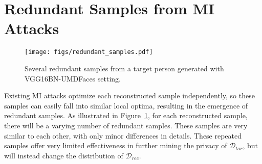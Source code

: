 
\section{Redundant Samples from MI Attacks}
\begin{figure}[t]%
	\centering
	\texttt{[image: figs/redundant\_samples.pdf]}
	\caption{Several redundant samples from a target person generated with VGG16BN-UMDFaces setting.}
	\label{fig:redundant_samples}
\end{figure}
Existing MI attacks optimize each reconstructed sample independently, so these samples can easily fall into similar local optima, resulting in the emergence of redundant samples.
As illustrated in Figure~\ref{fig:redundant_samples}, for each reconstructed sample, there will be a varying number of redundant samples.
These samples are very similar to each other, with only minor differences in details.
These repeated samples offer very limited effectiveness in further mining the privacy of $\mathcal{D}_{tar}$, but will instead change the distribution of $\mathcal{D}_{rec}$.



